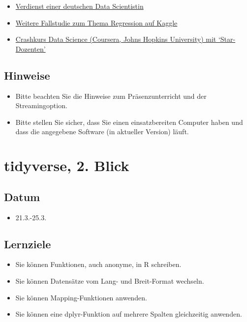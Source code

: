 \documentclass[
]{book}
\providecommand{\tightlist}{%
  \setlength{\itemsep}{0pt}\setlength{\parskip}{0pt}}
\begin{document}
\begin{itemize}
\tightlist
\item
  \href{https://www.zeit.de/arbeit/2020-10/data-scientist-gehalt-geldanlage-programmieren-kontoauszug}{Verdienst einer deutschen Data Scientistin}
\item
  \href{https://www.kaggle.com/micahshull/r-bike-sharing-linear-regression}{Weitere Fallstudie zum Thema Regression auf Kaggle}
\item
  \href{https://www.coursera.org/learn/data-science-course}{Crashkurs Data Science (Coursera, Johns Hopkins University) mit `Star-Dozenten'}
\end{itemize}

\hypertarget{hinweise}{%
\subsection{Hinweise}\label{hinweise}}

\begin{itemize}
\tightlist
\item
  Bitte beachten Sie die Hinweise zum Präsenzunterricht und der Streamingoption.
\item
  Bitte stellen Sie sicher, dass Sie einen einsatzbereiten Computer haben und dass die angegebene Software (in aktueller Version) läuft.
\end{itemize}

\hypertarget{tidyverse-2.-blick}{%
\section{tidyverse, 2. Blick}\label{tidyverse-2.-blick}}

\hypertarget{datum-1}{%
\subsection{Datum}\label{datum-1}}

\begin{itemize}
\tightlist
\item
  21.3.-25.3.
\end{itemize}

\hypertarget{lernziele-2}{%
\subsection{Lernziele}\label{lernziele-2}}

\begin{itemize}
\tightlist
\item
  Sie können Funktionen, auch anonyme, in R schreiben.
\item
  Sie können Datensätze vom Lang- und Breit-Format wechseln.
\item
  Sie können Mapping-Funktionen anwenden.
\item
  Sie können eine dplyr-Funktion auf mehrere Spalten gleichzeitig anwenden.
\end{itemize}
\end{document}

